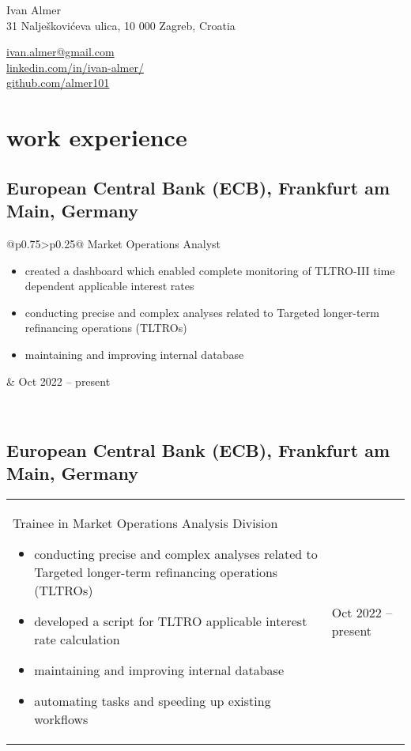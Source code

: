 \documentclass[a4paper]{article}
\makeatletter
\newlength{\tablewidth}
\newenvironment{period}[2]{%
\newcommand{\sarma}{#2}%
\setlength{\tablewidth}{\linewidth}
\addtolength{\tablewidth}{-2\tabcolsep}
\begin{tabular}{@{}p{0.75\tablewidth}>{\raggedleft\arraybackslash}p{0.25\tablewidth}@{}}%
#1 \newline
\begin{itemize}
}{%
\end{itemize} & \sarma \\%
\end{tabular}\\
}
\makeatother
\begin{document}
\fontfamily{\sfdefault}
\selectfont

\begin{minipage}{.5\textwidth}
\LARGE{Ivan Almer}\\
\normalsize{31 Nalješkovićeva ulica, 10 000 Zagreb, Croatia}
\end{minipage}%
\begin{minipage}{.5\textwidth}
\raggedleft
\href{mailto:ivan.almer@gmail.com}{ivan.almer@gmail.com} \\
\href{https://www.linkedin.com/in/ivan-almer/}{linkedin.com/in/ivan-almer/} \\
\href{https://github.com/almer101}{github.com/almer101} \\
\end{minipage}

\vspace{1em}

\section{work experience}
\subsection{European Central Bank (ECB), Frankfurt am Main, Germany}
\begin{period}{Market Operations Analyst}{Oct 2022 -- present}
        \item 
            created a dashboard which enabled complete monitoring of TLTRO-III time dependent applicable interest rates
        \item 
            conducting precise and complex analyses related to Targeted longer-term refinancing operations (TLTROs)
        \item
            maintaining and improving internal database
\end{period}
\subsection{European Central Bank (ECB), Frankfurt am Main, Germany}
\begin{period}{Trainee in Market Operations Analysis Division}{Dec 2021 -- Oct 2022}
        \item 
            conducting precise and complex analyses related to Targeted longer-term refinancing operations (TLTROs) 
        \item 
            developed a script for TLTRO applicable interest rate calculation
        \item
            maintaining and improving internal database
        \item 
            automating tasks and speeding up existing workflows
\end{period}
\end{document}
